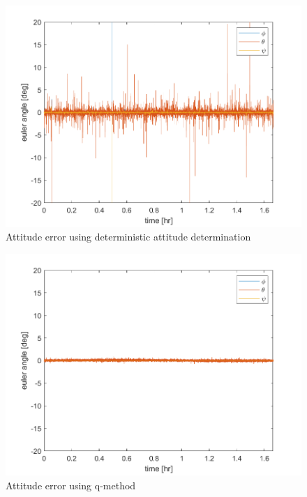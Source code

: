\begin{figure}[H]
\centering
\includegraphics[scale=0.6]{Images/ps7_problem2_DADFict.png}
\caption{Attitude error using deterministic attitude determination}
\label{fig:ps7_problem2_DADFict}
\end{figure}

\begin{figure}[H]
\centering
\includegraphics[scale=0.6]{Images/ps7_problem2_qMethod.png}
\caption{Attitude error using q-method}
\label{fig:ps7_problem2_qMethod}
\end{figure}


